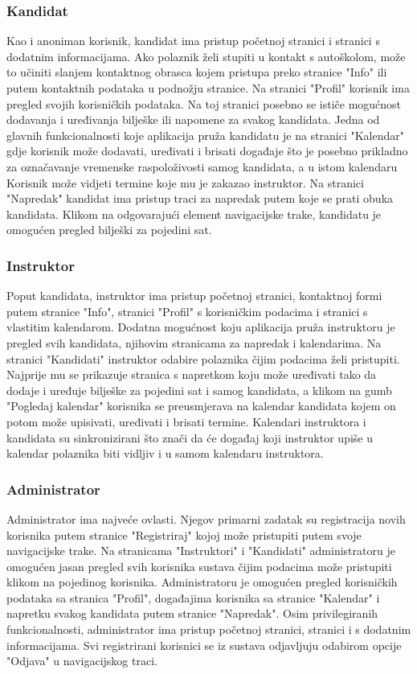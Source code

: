 \subsubsection{Kandidat}
Kao i anoniman korisnik, kandidat ima pristup početnoj stranici i stranici s dodatnim informacijama. Ako polaznik želi stupiti u kontakt s autoškolom, može to učiniti slanjem kontaktnog obrasca kojem pristupa preko stranice "Info" ili putem kontaktnih podataka u podnožju stranice. Na stranici "Profil" korisnik ima pregled svojih korisničkih podataka. Na toj stranici posebno se ističe mogućnost dodavanja i uređivanja bilješke ili napomene za svakog kandidata. Jedna od glavnih funkcionalnosti koje aplikacija pruža kandidatu je na stranici "Kalendar" gdje korisnik može dodavati, uređivati i brisati događaje što je posebno prikladno za označavanje vremenske raspoloživosti samog kandidata, a u istom kalendaru Korisnik može vidjeti termine koje mu je zakazao instruktor. Na stranici "Napredak" kandidat ima pristup traci za napredak putem koje se prati obuka kandidata. Klikom na odgovarajući element navigacijske trake, kandidatu je omogućen pregled bilješki za pojedini sat.
\subsubsection{Instruktor}
Poput kandidata, instruktor ima pristup početnoj stranici, kontaktnoj formi putem stranice "Info", stranici "Profil" s korisničkim podacima i stranici s vlastitim kalendarom. Dodatna mogućnost koju aplikacija pruža instruktoru je pregled svih kandidata, njihovim stranicama za napredak i kalendarima. Na stranici "Kandidati" instruktor odabire polaznika čijim podacima želi pristupiti. Najprije mu se prikazuje stranica s napretkom koju može uređivati tako da dodaje i uređuje bilješke za pojedini sat i samog kandidata, a klikom na gumb "Pogledaj kalendar" korisnika se preusmjerava na kalendar kandidata kojem on potom može upisivati, uređivati i brisati termine. Kalendari instruktora i kandidata su sinkronizirani što znači da će događaj koji instruktor upiše u kalendar polaznika biti vidljiv i u samom kalendaru instruktora.
\subsubsection{Administrator}
Administrator ima najveće ovlasti. Njegov primarni zadatak su registracija novih korisnika putem stranice "Registriraj" kojoj može pristupiti putem svoje navigacijske trake. Na stranicama "Instruktori" i "Kandidati" administratoru je omogućen jasan pregled svih korisnika sustava čijim podacima može pristupiti klikom na pojedinog korisnika. Administratoru je omogućen pregled korisničkih podataka sa stranica "Profil", događajima korisnika sa stranice "Kalendar" i napretku svakog kandidata putem stranice "Napredak". Osim privilegiranih funkcionalnosti, administrator ima pristup početnoj stranici, stranici i s dodatnim informacijama.
\newline
Svi registrirani korisnici se iz sustava odjavljuju odabirom opcije "Odjava" u navigacijskog traci.


